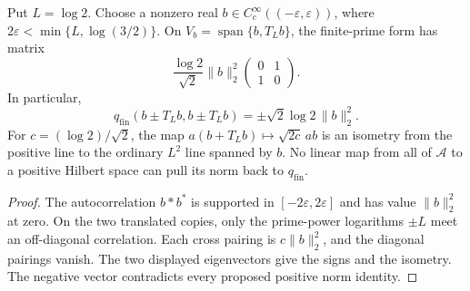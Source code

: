 \begin{proposition}
\label{v4-arith:sc:two-signs}
Put $L=\log2$. Choose a nonzero real
$b\in C_c^\infty((-\varepsilon,\varepsilon))$, where
$2\varepsilon<\min\{L,\log(3/2)\}$.
On $V_b=\operatorname{span}\{b,T_Lb\}$, the finite-prime form has matrix
\[
 \frac{\log2}{\sqrt2}\|b\|_2^2
 \begin{pmatrix}0&1\\1&0\end{pmatrix}.
\]
In particular,
\[
 q_{\mathrm{fin}}(b\pm T_Lb,b\pm T_Lb)
       =\pm\sqrt2\log2\,\|b\|_2^2.
\]
For $c=(\log2)/\sqrt2$, the map
$a(b+T_Lb)\mapsto\sqrt{2c}\,a b$ is an isometry from the positive
line to the ordinary $L^2$ line spanned by $b$.
No linear map from all of $\mathscr A$ to a positive Hilbert space
can pull its norm back to $q_{\mathrm{fin}}$.
\end{proposition}
\begin{proof}
The autocorrelation $b*b^*$ is supported in
$[-2\varepsilon,2\varepsilon]$ and has value $\|b\|_2^2$ at zero.
On the two translated copies, only the prime-power logarithms
$\pm L$ meet an off-diagonal correlation. Each cross pairing is
$c\|b\|_2^2$, and the diagonal pairings vanish.
The two displayed eigenvectors give the signs and the isometry.
The negative vector contradicts every proposed positive norm identity.
\end{proof}

